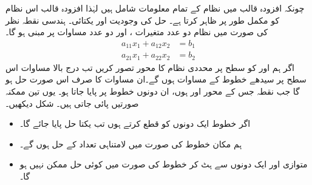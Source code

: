 چونکہ افزودہ قالب میں نظام  کے تمام معلومات شامل ہیں لہٰذا افزودہ قالب اس نظام کو مکمل طور پر ظاہر کرتا ہے۔
\quad حل کی وجودیت اور یکتائی۔ ہندسی نقطہ نظر\\
 کی صورت میں نظام دو عدد متغیرات ،  اور دو عدد مساوات پر مبنی ہو گا۔
\begin{align*}
a_{11}x_1+a_{12}x_2&=b_1\\
a_{21}x_1+a_{22}x_2&=b_2
\end{align*}
اگر ہم  اور   کو سطح  پر  محددی نظام کا محور  تصور  کریں تب درج بالا مساوات اس سطح پر سیدھے خطوط کے مساوات ہوں گے۔ان مساوات کا صرف اس صورت حل  ہو گا جب نقطہ  جس کے محور  اور  ہوں، ان دونوں خطوط پر پایا جاتا ہو۔ یوں تین ممکنہ صورتیں پائی جاتی ہیں۔ شکل  دیکھیں۔
\begin{itemize}
\item
اگر خطوط ایک دونوں کو قطع کرتے ہوں تب یکتا حل پایا جائے گا۔
\item
ہم مکان خطوط کی صورت میں لامتناہی تعداد کے حل ہوں گے۔
\item
متوازی اور ایک دونوں سے ہٹ کر خطوط کی صورت میں کوئی حل ممکن نہیں ہو گا۔
\end{itemize}
%
